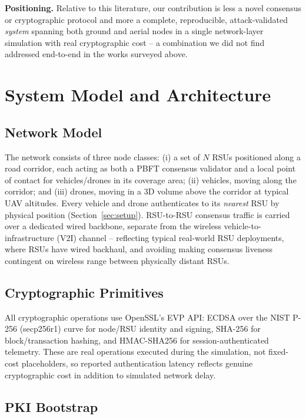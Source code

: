\documentclass[conference]{IEEEtran}
\begin{document}
\textbf{Positioning.} Relative to this literature, our contribution
is less a novel consensus or cryptographic protocol and more a
complete, reproducible, attack-validated \emph{system} spanning both
ground and aerial nodes in a single network-layer simulation with
real cryptographic cost -- a combination we did not find addressed
end-to-end in the works surveyed above.

\section{System Model and Architecture}

\subsection{Network Model}

The network consists of three node classes: (i) a set of $N$ RSUs
positioned along a road corridor, each acting as both a PBFT
consensus validator and a local point of contact for vehicles/drones
in its coverage area; (ii) vehicles, moving along the corridor; and
(iii) drones, moving in a 3D volume above the corridor at typical
UAV altitudes. Every vehicle and drone authenticates to its
\emph{nearest} RSU by physical position (Section~\ref{sec:setup}).
RSU-to-RSU consensus traffic is carried over a dedicated wired
backbone, separate from the wireless vehicle-to-infrastructure (V2I)
channel -- reflecting typical real-world RSU deployments, where RSUs
have wired backhaul, and avoiding making consensus liveness
contingent on wireless range between physically distant RSUs.

\subsection{Cryptographic Primitives}

All cryptographic operations use OpenSSL's EVP API: ECDSA over the
NIST P-256 (secp256r1) curve for node/RSU identity and signing,
SHA-256 for block/transaction hashing, and HMAC-SHA256 for
session-authenticated telemetry. These are real operations executed
during the simulation, not fixed-cost placeholders, so reported
authentication latency reflects genuine cryptographic cost in
addition to simulated network delay.

\subsection{PKI Bootstrap}
\end{document}
